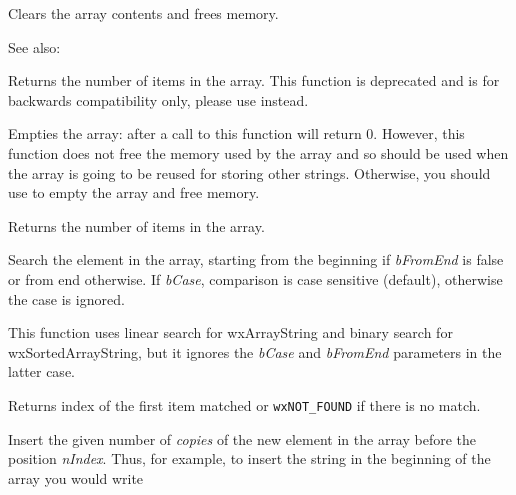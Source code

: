 Clears the array contents and frees memory.

See also: 

\label{wxarraystringcount}


Returns the number of items in the array. This function is deprecated and is
for backwards compatibility only, please use 
 instead.

\label{wxarraystringempty}


Empties the array: after a call to this function 
 will return $0$. However, this
function does not free the memory used by the array and so should be used when
the array is going to be reused for storing other strings. Otherwise, you
should use  to empty the array and free
memory.

\label{wxarraystringgetcount}


Returns the number of items in the array.

\label{wxarraystringindex}


Search the element in the array, starting from the beginning if
{\it bFromEnd} is false or from end otherwise. If {\it bCase}, comparison is
case sensitive (default), otherwise the case is ignored.

This function uses linear search for wxArrayString and binary search for
wxSortedArrayString, but it ignores the {\it bCase} and {\it bFromEnd} 
parameters in the latter case.

Returns index of the first item matched or {\tt wxNOT\_FOUND} if there is no match.

\label{wxarraystringinsert}


Insert the given number of {\it copies} of the new element in the array before the position {\it nIndex}. Thus, for
example, to insert the string in the beginning of the array you would write


